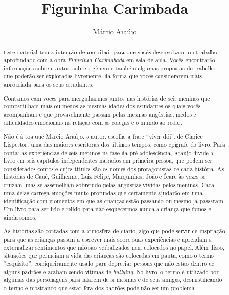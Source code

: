 \documentclass[11pt]{extarticle}
\newcommand{\AutorLivro}{Márcio Araújo}
\newcommand{\TituloLivro}{Figurinha Carimbada}
\newcommand{\colaborador}{Gabriela Karam}
\begin{document}
\title{\TituloLivro}
\author{\AutorLivro}
\def\authornotes{\colaborador}

\date{}
\maketitle


\tableofcontents


\begin{abstract}

Este material tem a intenção de contribuir para que vocês desenvolvam um trabalho aprofundado com a obra \textit{Figurinha Carimabada} em sala de aula.
Vocês encontrarão informações sobre o autor, sobre o gênero e também 
algumas propostas de trabalho que poderão ser exploradas livremente, 
da forma que vocês considerarem mais apropriada para os seus estudantes.

Contamos com vocês para mergulharmos juntos nas histórias de seis meninos que compartilham mais ou menos as mesmas idades dos estudantes os quais vocês acompanham e que provavelmente passam pelas mesmas angústias, medos e dificuldades emocionais na relação com os colegas e o mundo ao redor. 

Não é à toa que Márcio Araújo, o autor, escolhe a frase ``viver dói'', de Clarice Lispector, uma das maiores escritoras dos últimos tempos, como epígrafe do livro. Para contar as experiências de seis meninos na fase da pré-adolescência, Araújo divide o livro em seis capítulos independentes narrados em primeira pessoa, que podem ser considerados contos e cujos títulos são os nomes dos protagonistas de cada história. As histórias de Cauê, Guilherme, Luiz Felipe, Marquinhos, João e Ícaro às vezes se cruzam, mas se assemelham sobretudo pelas angústias vividas pelos meninos. Cada uma delas carrega emoções muito profundas que certamente ajudarão em uma identificação com momentos em que as crianças estão passando ou mesmo já passaram. Um livro para ser lido e relido para não esquecermos nunca a criança que fomos e ainda somos.

As histórias são contadas com a atmosfera de diário, algo que pode servir de inspiração para que as crianças passem a escrever mais sobre suas experiências e aprendam a externalizar sentimentos que não são verbalizados nem colocados no papel. Além disso, situações que permeiam a vida das crianças são colocadas em pauta, como o termo ``esquisito'', corriqueiramente usado para depreciar pessoas que não estão dentro de alguns padrões e acabam sendo vítimas de \textit{bullying}. No livro, o termo é utilizado por algumas das personagens para falarem de si mesmas e de seus amigos, desmistificando o termo e mostrando que estar fora dos padrões pode não ser um problema. 


\end{abstract}
\end{document}
